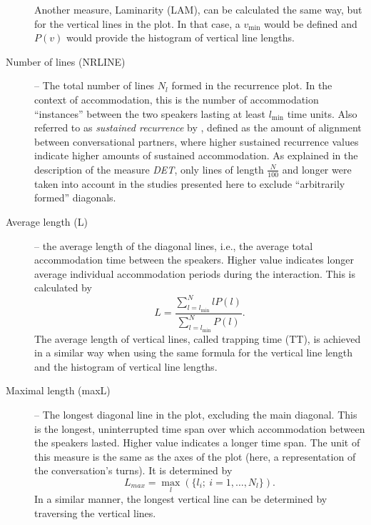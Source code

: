 \begin{description}
	Another measure, Laminarity (LAM), can be calculated the same way, but for the vertical lines in the plot.
	In that case, a $v_{\min}$ would be defined and $P(v)$ would provide the histogram of vertical line lengths.
	
	\item[Number of lines (NRLINE)] -- The total number of lines $N_l$ formed in the recurrence plot.
	In the context of accommodation, this is the number of accommodation \enquote{instances} between the two speakers lasting at least $l_{\min}$ time units.
	Also referred to as \emph{sustained recurrence} by \citet{Borrie2019syncing}, defined as the amount of alignment between conversational partners, where higher sustained recurrence values indicate higher amounts of sustained accommodation.
	As explained in the description of the measure \emph{DET}, only lines of length $\frac{N}{100}$ and longer were taken into account in the studies presented here to exclude \enquote{arbitrarily formed} diagonals.
	
	\item[Average length (L)] -- the average length of the diagonal lines, i.e., the average total accommodation time between the speakers.
	Higher value indicates longer average individual accommodation periods during the interaction.
	This is calculated by
	\begin{equation}
		\label{eq:l}
		L = \frac{\sum_{l=l_{\min}}^N l P(l)}{\sum_{l=l_{\min}}^N P(l)}.
	\end{equation}
	The average length of vertical lines, called trapping time (TT), is achieved in a similar way when using the same formula for the vertical line length and the histogram of vertical line lengths.
	
	\item[Maximal length (maxL)] -- The longest diagonal line in the plot, excluding the main diagonal.	
	This is the longest, uninterrupted time span over which accommodation between the speakers lasted.
	Higher value indicates a longer time span.
	The unit of this measure is the same as the axes of the plot (here, a representation of the conversation's turns).
	It is determined by
	\begin{equation}
		\label{eq:maxl}
		L_{max} = \max_{l} (\{l_i; \ i=1, \ldots, N_l\}).
	\end{equation}
	In a similar manner, the longest vertical line can be determined by traversing the vertical lines.
	

\end{description}

